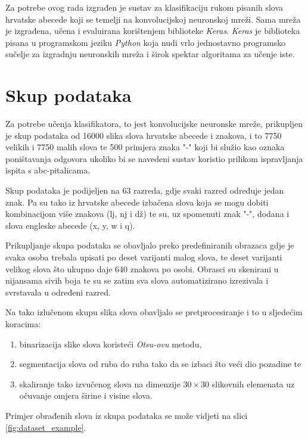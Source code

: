 Za potrebe ovog rada izgrađen je sustav za klasifikaciju rukom pisanih slova hrvatske abecede koji se temelji na konvolucijskoj neuronskoj mreži. Sama mreža je izgrađena, učena i evaluirana korištenjem biblioteke \emph{Keras}. \emph{Keras} je biblioteka pisana u programskom jeziku \emph{Python} koja nudi vrlo jednostavno programsko sučelje za izgradnju neuronskih mreža i širok spektar algoritama za učenje iste.

\section{Skup podataka}

Za potrebe učenja klasifikatora, to jest konvolucijske neuronske mreže, prikupljen je skup podataka od \num{16000} slika slova hrvatske abecede i znakova, i to \num{7750} velikih i \num{7750} malih slova te \num{500} primjera znaka "-" koji bi služio kao oznaka poništavanja odgovora ukoliko bi se navedeni sustav koristio prilikom ispravljanja ispita s abc-pitalicama.

Skup podataka je podijeljen na 63 razreda, gdje svaki razred određuje jedan znak. Pa su tako iz hrvatske abecede izbačena slova koja se mogu dobiti kombinacijom više znakova (lj, nj i dž) te su, uz spomenuti znak "-", dodana i slova engleske abecede (x, y, w i q).

Prikupljanje skupa podataka se obavljalo preko predefiniranih obrazaca gdje je svaka osoba trebala upisati po deset varijanti malog slova, te deset varijanti velikog slova što ukupno daje 640 znakova po osobi. Obrasci su skenirani u nijansama sivih boja te su se zatim sva slova automatizirano izrezivala i svrstavala u određeni razred.

Na tako izlučenom skupu slika slova obavljalo se pretprocesiranje i to u sljedećim koracima:

 \begin{enumerate}
   \item binarizacija slike slova koristeći \emph{Otsu-ovu} metodu, 
   \item segmentacija slova od ruba do ruba tako da se izbaci što veći dio pozadine te
   \item skaliranje tako izvučenog slova na dimenzije $30 \times 30$ slikovnih elemenata uz očuvanje omjera širine i visine slova.
 \end{enumerate}

Primjer obrađenih slova iz skupa podataka se može vidjeti na slici \ref{fig:dataset_example}.


